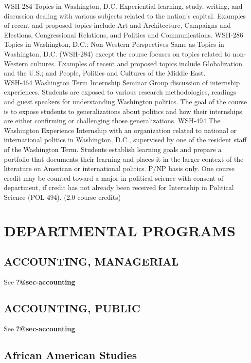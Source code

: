 \documentclass[
  letterpaper,
]{scrbook}
\begin{document}
WSH-284 Topics in Washington, D.C. Experiential learning, study,
writing, and discussion dealing with various subjects related to the
nation's capital. Examples of recent and proposed topics include Art and
Architecture, Campaigns and Elections, Congressional Relations, and
Politics and Communications. WSH-286 Topics in Washington, D.C.:
Non-Western Perspectives Same as Topics in Washington, D.C. (WSH-284)
except the course focuses on topics related to non-Western cultures.
Examples of recent and proposed topics include Globalization and the
U.S.; and People, Politics and Cultures of the Middle East.\\
WSH-464 Washington Term Internship Seminar Group discussion of
internship experiences. Students are exposed to various research
methodologies, readings and guest speakers for understanding Washington
politics. The goal of the course is to expose students to
generalizations about politics and how their internships are either
confirming or challenging those generalizations. WSH-494 The Washington
Experience Internship with an organization related to national or
international politics in Washington, D.C., supervised by one of the
resident staff of the Washington Term. Students establish learning goals
and prepare a portfolio that documents their learning and places it in
the larger context of the literature on American or international
politics. P/NP basis only. One course credit may be counted toward a
major in political science with consent of department, if credit has not
already been received for Internship in Political Science (POL-494).
(2.0 course credits)

\chapter{DEPARTMENTAL PROGRAMS}\label{departmental-programs}

\section{ACCOUNTING, MANAGERIAL}\label{accounting-managerial}

See \textbf{?@sec-accounting}

\section{ACCOUNTING, PUBLIC}\label{accounting-public}

See \textbf{?@sec-accounting}

\section{African American Studies}\label{african-american-studies}
\end{document}
